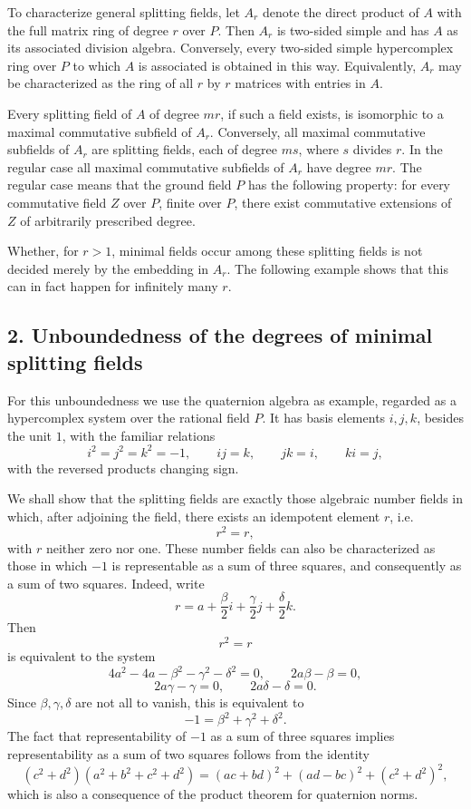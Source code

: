 \documentclass[
  12pt,
]{article}
\begin{document}
To characterize general splitting fields, let \(A_r\) denote the direct
product of \(A\) with the full matrix ring of degree \(r\) over \(P\).
Then \(A_r\) is two-sided simple and has \(A\) as its associated
division algebra. Conversely, every two-sided simple hypercomplex ring
over \(P\) to which \(A\) is associated is obtained in this way.
Equivalently, \(A_r\) may be characterized as the ring of all \(r\) by
\(r\) matrices with entries in \(A\).

Every splitting field of \(A\) of degree \(mr\), if such a field exists,
is isomorphic to a maximal commutative subfield of \(A_r\). Conversely,
all maximal commutative subfields of \(A_r\) are splitting fields, each
of degree \(ms\), where \(s\) divides \(r\). In the regular case all
maximal commutative subfields of \(A_r\) have degree \(mr\). The regular
case means that the ground field \(P\) has the following property: for
every commutative field \(Z\) over \(P\), finite over \(P\), there exist
commutative extensions of \(Z\) of arbitrarily prescribed degree.

Whether, for \(r>1\), minimal fields occur among these splitting fields
is not decided merely by the embedding in \(A_r\). The following example
shows that this can in fact happen for infinitely many \(r\).

\subsection{2. Unboundedness of the degrees of minimal splitting
fields}\label{unboundedness-of-the-degrees-of-minimal-splitting-fields}

For this unboundedness we use the quaternion algebra as example,
regarded as a hypercomplex system over the rational field \(P\). It has
basis elements \(i,j,k\), besides the unit \(1\), with the familiar
relations \[
  i^2=j^2=k^2=-1,
  \qquad ij=k,
  \qquad jk=i,
  \qquad ki=j,
\] with the reversed products changing sign.

We shall show that the splitting fields are exactly those algebraic
number fields in which, after adjoining the field, there exists an
idempotent element \(r\), i.e. \[
  r^2=r,
\] with \(r\) neither zero nor one. These number fields can also be
characterized as those in which \(-1\) is representable as a sum of
three squares, and consequently as a sum of two squares. Indeed, write
\[
  r=a+\frac{\beta}{2}i+
       \frac{\gamma}{2}j+
       \frac{\delta}{2}k.
\] Then \[
  r^2=r
\] is equivalent to the system \[
  4a^2-4a-\beta^2-\gamma^2-\delta^2=0,
  \qquad
  2a\beta-\beta=0,
\] \[
  2a\gamma-\gamma=0,
  \qquad
  2a\delta-\delta=0.
\] Since \(\beta,\gamma,
\delta\) are not all to vanish, this is equivalent to \[
  -1=\beta^2+
\gamma^2+\delta^2.
\] The fact that representability of \(-1\) as a sum of three squares
implies representability as a sum of two squares follows from the
identity \[
  (c^2+d^2)(a^2+b^2+c^2+d^2)
  =(ac+bd)^2+(ad-bc)^2+(c^2+d^2)^2,
\] which is also a consequence of the product theorem for quaternion
norms.
\end{document}
